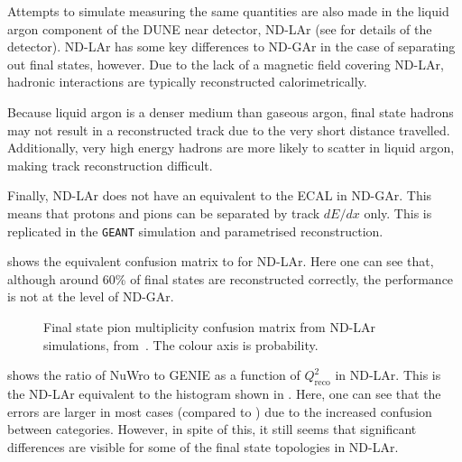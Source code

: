 Attempts to simulate measuring the same quantities are also made in the liquid argon component of the DUNE near detector, ND-LAr (see  for details of the detector).
ND-LAr has some key differences to ND-GAr in the case of separating out final states, however. 
Due to the lack of a magnetic field covering ND-LAr, hadronic interactions are typically reconstructed calorimetrically.

Because liquid argon is a denser medium than gaseous argon, final state hadrons may not result in a reconstructed track due to the very short distance travelled.
Additionally, very high energy hadrons are more likely to scatter in liquid argon, making track reconstruction difficult.

Finally, ND-LAr does not have an equivalent to the ECAL in ND-GAr.
This means that protons and pions can be separated by track $dE/dx$ only.
This is replicated in the \texttt{GEANT} simulation and parametrised reconstruction.

 shows the equivalent confusion matrix to  for ND-LAr.
Here one can see that, although around 60\% of final states are reconstructed correctly, the performance is not at the level of ND-GAr.

\begin{figure}[h]
	\begin{adjustbox}{max totalsize=.6\linewidth, center}
		
	\end{adjustbox}
	\caption[Final state pion multiplicity confusion matrix from ND-LAr simulations.]{Final state pion multiplicity confusion matrix from ND-LAr simulations, from~\cite{ndCdr}. The colour axis is probability.}
	\label{fig:larConfusMat}
\end{figure}

 shows the ratio of NuWro to GENIE as a function of $Q^{2}_{\textrm{reco}}$ in ND-LAr.
This is the ND-LAr equivalent to the histogram shown in . 
Here, one can see that the errors are larger in most cases (compared to ) due to the increased confusion between categories.
However, in spite of this, it still seems that significant differences are visible for some of the final state topologies in ND-LAr.

